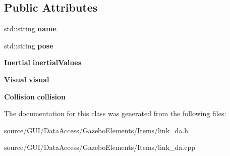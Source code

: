 \subsection*{Public Attributes}
\begin{DoxyCompactItemize}
\item 
std\+::string {\bfseries name}\label{classlink___d_a_a426d550cf54d264f1e0b0fda91bba151}

\item 
std\+::string {\bfseries pose}\label{classlink___d_a_a69423104d939c940042f8115dda647d4}

\item 
{\bf Inertial} {\bfseries inertial\+Values}\label{classlink___d_a_af276135885f7d6ae7750b56dcb0abee3}

\item 
{\bf Visual} {\bfseries visual}\label{classlink___d_a_aef6e7dd507629dac36c96147b949e697}

\item 
{\bf Collision} {\bfseries collision}\label{classlink___d_a_a53a8eda6cb0413bf5192953963f2e799}

\end{DoxyCompactItemize}


The documentation for this class was generated from the following files\+:\begin{DoxyCompactItemize}
\item 
source/\+G\+U\+I/\+Data\+Access/\+Gazebo\+Elements/\+Items/link\+\_\+da.\+h\item 
source/\+G\+U\+I/\+Data\+Access/\+Gazebo\+Elements/\+Items/link\+\_\+da.\+cpp\end{DoxyCompactItemize}
